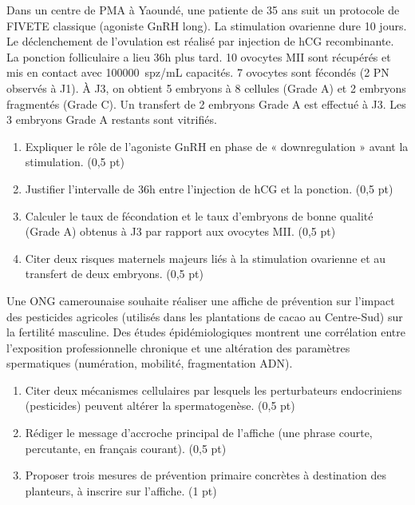 \documentclass[11pt]{article}
\begin{document}
\begin{exercice}
\label{exo:fivete}
Dans un centre de PMA à Yaoundé, une patiente de 35 ans suit un protocole de FIVETE classique (agoniste GnRH long). La stimulation ovarienne dure 10 jours. Le déclenchement de l'ovulation est réalisé par injection de hCG recombinante. La ponction folliculaire a lieu 36h plus tard. 10 ovocytes MII sont récupérés et mis en contact avec \SI{100000}{spz/mL} capacités. 7 ovocytes sont fécondés (2 PN observés à J1). À J3, on obtient 5 embryons à 8 cellules (Grade A) et 2 embryons fragmentés (Grade C). Un transfert de 2 embryons Grade A est effectué à J3. Les 3 embryons Grade A restants sont vitrifiés.

\begin{enumerate}
\item Expliquer le rôle de l'agoniste GnRH en phase de « downregulation » avant la stimulation. \hfill (0,5 pt)
\item Justifier l'intervalle de 36h entre l'injection de hCG et la ponction. \hfill (0,5 pt)
\item Calculer le taux de fécondation et le taux d'embryons de bonne qualité (Grade A) obtenus à J3 par rapport aux ovocytes MII. \hfill (0,5 pt)
\item Citer deux risques maternels majeurs liés à la stimulation ovarienne et au transfert de deux embryons. \hfill (0,5 pt)
\end{enumerate}
\end{exercice}

\begin{exercice}
\label{exo:sensibilisation}
Une ONG camerounaise souhaite réaliser une affiche de prévention sur l'impact des pesticides agricoles (utilisés dans les plantations de cacao au Centre-Sud) sur la fertilité masculine. Des études épidémiologiques montrent une corrélation entre l'exposition professionnelle chronique et une altération des paramètres spermatiques (numération, mobilité, fragmentation ADN).

\begin{enumerate}
\item Citer deux mécanismes cellulaires par lesquels les perturbateurs endocriniens (pesticides) peuvent altérer la spermatogenèse. \hfill (0,5 pt)
\item Rédiger le message d'accroche principal de l'affiche (une phrase courte, percutante, en français courant). \hfill (0,5 pt)
\item Proposer trois mesures de prévention primaire concrètes à destination des planteurs, à inscrire sur l'affiche. \hfill (1 pt)
\end{enumerate}
\end{exercice}
\end{document}
